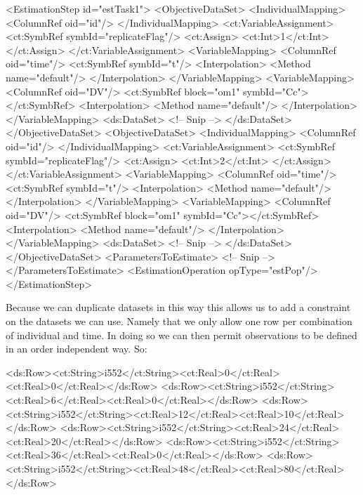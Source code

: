\documentclass[a4paper,10pt]{article}
\begin{document}
\begin{xmlcode}
<EstimationStep id="estTask1">
    <ObjectiveDataSet>
        <IndividualMapping>
            <ColumnRef oid="id"/>
        </IndividualMapping>
        <ct:VariableAssignment>
            <ct:SymbRef symbId="replicateFlag"/>
            <ct:Assign>
                <ct:Int>1</ct:Int>
            </ct:Assign>
        </ct:VariableAssignment>
        <VariableMapping>
            <ColumnRef oid="time"/>
            <ct:SymbRef symbId="t"/>
            <Interpolation>
                <Method name="default"/>
            </Interpolation>
        </VariableMapping>
        <VariableMapping>
            <ColumnRef oid="DV"/>
            <ct:SymbRef block="om1" symbId="Cc"></ct:SymbRef>
            <Interpolation>
                <Method name="default"/>
            </Interpolation>
        </VariableMapping>
        <ds:DataSet>
            <!-- Snip -->
        </ds:DataSet>
    </ObjectiveDataSet>
    <ObjectiveDataSet>
        <IndividualMapping>
            <ColumnRef oid="id"/>
        </IndividualMapping>
        <ct:VariableAssignment>
            <ct:SymbRef symbId="replicateFlag"/>
            <ct:Assign>
                <ct:Int>2</ct:Int>
            </ct:Assign>
        </ct:VariableAssignment>
        <VariableMapping>
            <ColumnRef oid="time"/>
            <ct:SymbRef symbId="t"/>
            <Interpolation>
                <Method name="default"/>
            </Interpolation>
        </VariableMapping>
        <VariableMapping>
            <ColumnRef oid="DV"/>
            <ct:SymbRef block="om1" symbId="Cc"></ct:SymbRef>
            <Interpolation>
                <Method name="default"/>
            </Interpolation>
        </VariableMapping>
        <ds:DataSet>
            <!-- Snip -->
        </ds:DataSet>
    </ObjectiveDataSet>
    <ParametersToEstimate>
      <!-- Snip -->
    </ParametersToEstimate>
    <EstimationOperation opType="estPop"/>
</EstimationStep>
\end{xmlcode}
% 
Because we can duplicate datasets in this way this allows us to add a
constraint on the datasets we can use. Namely that we only allow one 
row per combination of individual and time. In doing so we can
then permit observations to be defined in an order independent
way. So:
%
\begin{xmlcode}
<ds:Row><ct:String>i552</ct:String><ct:Real>0</ct:Real><ct:Real>0</ct:Real></ds:Row>
<ds:Row><ct:String>i552</ct:String><ct:Real>6</ct:Real><ct:Real>0</ct:Real></ds:Row>
<ds:Row><ct:String>i552</ct:String><ct:Real>12</ct:Real><ct:Real>10</ct:Real></ds:Row>
<ds:Row><ct:String>i552</ct:String><ct:Real>24</ct:Real><ct:Real>20</ct:Real></ds:Row>
<ds:Row><ct:String>i552</ct:String><ct:Real>36</ct:Real><ct:Real>0</ct:Real></ds:Row>
<ds:Row><ct:String>i552</ct:String><ct:Real>48</ct:Real><ct:Real>80</ct:Real></ds:Row>
\end{xmlcode}
\end{document}
